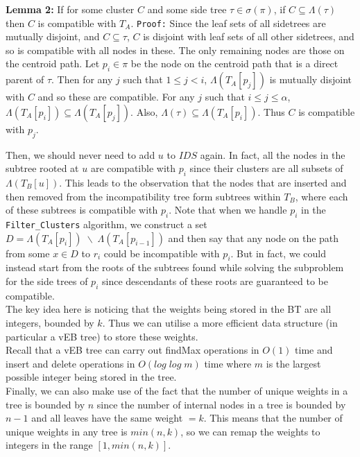 \documentclass[a4paper]{article}
\begin{document}
    \textbf{Lemma 2:} If for some cluster $C$ and some side tree $\tau \in \sigma(\pi)$, if $C \subseteq \Lambda(\tau)$ then $C$ is compatible with $T_A$.
    \texttt{Proof:} Since the leaf sets of all sidetrees are mutually disjoint, and $C \subseteq \tau$, $C$ is disjoint with leaf sets of all other sidetrees, and so is compatible with all nodes in these. The only remaining nodes are those on the centroid path. Let $p_i \in \pi$ be the node on the centroid path that is a direct parent of $\tau$. Then for any $j$ such that $1 \leq j < i$, $\Lambda(T_A[p_j])$ is mutually disjoint with $C$ and so these are compatible. For any $j$ such that $i \leq j \leq \alpha$, $\Lambda(T_A[p_i]) \subseteq \Lambda(T_A[p_j])$. Also, $\Lambda(\tau) \subseteq \Lambda(T_A[p_i])$. Thus $C$ is compatible with $p_j$.

    Then, we should never need to add $u$ to $IDS$ again.
    In fact, all the nodes in the subtree rooted at $u$ are compatible with $p_i$ since their clusters are all subsets of $\Lambda(T_B[u])$. This leads to the observation that the nodes that are inserted and then removed from the incompatibility tree form subtrees within $T_B$, where each of these subtrees is compatible with $p_i$. Note that when we handle $p_i$ in the \texttt{Filter\_Clusters} algorithm, we construct a set $D = \Lambda(T_A[p_i]) \;\backslash\; \Lambda(T_A[p_{i-1}])$ and then say that any node on the path from some $x \in D$ to $r_i$ could be incompatible with $p_i$. But in fact, we could instead start from the roots of the subtrees found while solving the subproblem for the side trees of $p_i$ since descendants of these roots are guaranteed to be compatible.\\

    The key idea here is noticing that the weights being stored in the BT are all integers, bounded by $k$. Thus we can utilise a more efficient data structure (in particular a vEB tree) to store these weights.\\

    Recall that a vEB tree can carry out findMax operations in $O(1)$ time and insert and delete operations in $O(log\;log\;m)$ time where $m$ is the largest possible integer being stored in the tree.\\

    Finally, we can also make use of the fact that the number of unique weights in a tree is bounded by $n$ since the number of internal nodes in a tree is bounded by $n - 1$ and all leaves have the same weight $= k$. This means that the number of unique weights in any tree is $min(n, k)$, so we can remap the weights to integers in the range $[1, min(n, k)]$.\\
\end{document}
